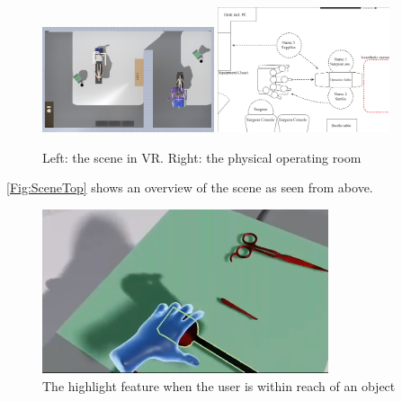 \begin{figure}
\centering
\includegraphics[width=0.45\textwidth]{FinishedSystem/SceneTop}
\includegraphics[width=0.45\textwidth]{FinishedSystem/overview_rotated}
\caption{Left: the scene in VR. Right: the physical operating room}
\label{Fig:SceneTop}
\end{figure}

\autoref{Fig:SceneTop} shows an overview of the scene as seen from above.

\begin{figure}
\centering
\includegraphics[width=0.75\textwidth]{FinishedSystem/grab}
\caption{The highlight feature when the user is within reach of an object}
\label{Fig:Grabering}
\end{figure}

